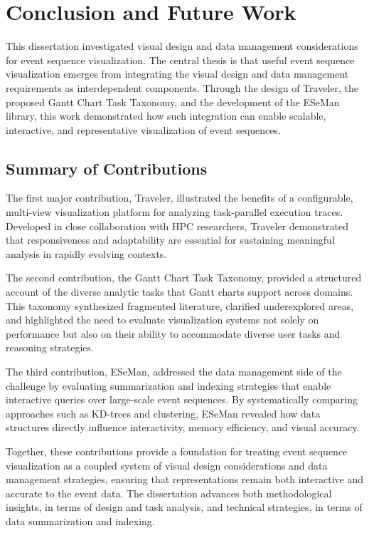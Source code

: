 \chapter{Conclusion and Future Work}
\label{chap:conclusion}

\begin{refsection}
This dissertation investigated visual design and data management considerations for event sequence visualization. The central thesis is that useful event sequence visualization emerges from integrating the visual design and data management requirements as interdependent components. Through the design of Traveler, the proposed Gantt Chart Task Taxonomy, and the development of the ESeMan library, this work demonstrated how such integration can enable scalable, interactive, and representative visualization of event sequences.

\section{Summary of Contributions}

The first major contribution, Traveler, illustrated the benefits of a configurable, multi-view visualization platform for analyzing task-parallel execution traces. Developed in close collaboration with HPC researchers, Traveler demonstrated that responsiveness and adaptability are essential for sustaining meaningful analysis in rapidly evolving contexts.  

The second contribution, the Gantt Chart Task Taxonomy, provided a structured account of the diverse analytic tasks that Gantt charts support across domains. This taxonomy synthesized fragmented literature, clarified underexplored areas, and highlighted the need to evaluate visualization systems not solely on performance but also on their ability to accommodate diverse user tasks and reasoning strategies.  

The third contribution, ESeMan, addressed the data management side of the challenge by evaluating summarization and indexing strategies that enable interactive queries over large-scale event sequences. By systematically comparing approaches such as KD-trees and clustering, ESeMan revealed how data structures directly influence interactivity, memory efficiency, and visual accuracy.  

Together, these contributions provide a foundation for treating event sequence visualization as a coupled system of visual design considerations and data management strategies, ensuring that representations remain both interactive and accurate to the event data. The dissertation advances both methodological insights, in terms of design and task analysis, and technical strategies, in terms of data summarization and indexing.


\end{refsection}
